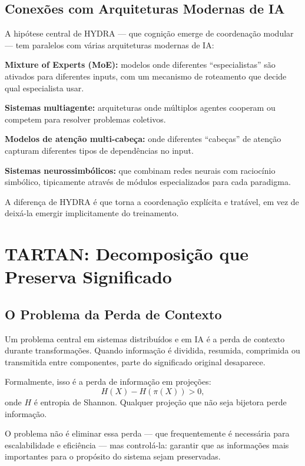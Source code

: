 \documentclass[11pt, a4paper]{article}
\theoremstyle{named}
\begin{document}
\subsection{Conexões com Arquiteturas Modernas de IA}

A hipótese central de HYDRA — que cognição emerge de coordenação
modular — tem paralelos com várias arquiteturas modernas de IA:

\textbf{Mixture of Experts (MoE):} modelos onde diferentes
``especialistas'' são ativados para diferentes inputs, com um
mecanismo de roteamento que decide qual especialista usar.

\textbf{Sistemas multiagente:} arquiteturas onde múltiplos agentes
cooperam ou competem para resolver problemas coletivos.

\textbf{Modelos de atenção multi-cabeça:} onde diferentes ``cabeças''
de atenção capturam diferentes tipos de dependências no input.

\textbf{Sistemas neurossimbólicos:} que combinam redes neurais com
raciocínio simbólico, tipicamente através de módulos especializados
para cada paradigma.

A diferença de HYDRA é que torna a coordenação explícita e tratável,
em vez de deixá-la emergir implicitamente do treinamento.

\section{TARTAN: Decomposição que Preserva Significado}

\subsection{O Problema da Perda de Contexto}

Um problema central em sistemas distribuídos e em IA é a perda de
contexto durante transformações. Quando informação é dividida,
resumida, comprimida ou transmitida entre componentes, parte do
significado original desaparece.

Formalmente, isso é a perda de informação em projeções:
\[
  H(X) - H(\pi(X)) > 0,
\]
onde $H$ é entropia de Shannon. Qualquer projeção que não seja
bijetora perde informação.

O problema não é eliminar essa perda — que frequentemente é necessária
para escalabilidade e eficiência — mas controlá-la: garantir que as
informações mais importantes para o propósito do sistema sejam
preservadas.
\end{document}
